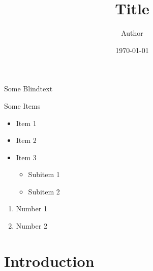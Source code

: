 \documentclass{beamer}
\title{Title}
\author{Author}
\date{\today{}}
\begin{document}
\begin{frame}
    \titlepage
\end{frame}

\begin{frame}{Some Blindtext}
\blindtext
\end{frame}

\begin{frame}{Some Items}
    \begin{itemize}
        \item Item 1
        \item Item 2
        \item Item 3
        \begin{itemize}
            \item Subitem 1
            \item Subitem 2
        \end{itemize}
    \end{itemize}

    \begin{enumerate}
        \item Number 1
        \item Number 2
    \end{enumerate}
\end{frame}

\section{Introduction}
\end{document}

